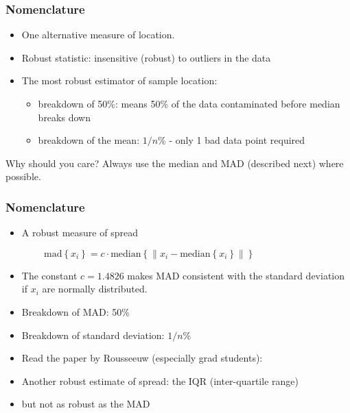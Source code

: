 \begin{frame}\frametitle{Nomenclature}
	{}
	\begin{itemize}
		\item	One alternative measure of location.
		\item	Robust statistic: insensitive (robust) to outliers in the data
		\item	The most robust estimator of sample location:
		\begin{itemize}
			\item	breakdown of 50\%: means 50\% of the data contaminated before median breaks down
			\item	breakdown of the mean: $1/n$\% - only 1 bad data point required
		\end{itemize}
	\end{itemize}
	\begin{exampleblock}{Why should you care?}
		Always use the median and MAD (described next) where possible.
	\end{exampleblock}
\end{frame}

\begin{frame}\frametitle{Nomenclature}
	{}
	\begin{itemize}
		\item	A robust measure of spread
	\end{itemize}
	$ \qquad\qquad \text{mad}\left\{ x_i \right\} = c \cdot \text{median}\left\{ \| x_i - \text{median}\left\{ x_i \right\} \| \right\} $
	\begin{itemize}
		\item	The constant $c = 1.4826$ makes MAD consistent with the standard deviation if $x_i$ are normally distributed.
		\item	Breakdown of MAD: 50\%
		\item	Breakdown of standard deviation: $1/n$\%
	\end{itemize}
	\begin{itemize}
		\item	Read the paper by Rousseeuw (especially grad students):
		\iftoggle{hrymak}{
			\begin{itemize}
				\item	\href{http://literature.connectmv.com/item/173}{http://literature.connectmv.com/item/173}
			\end{itemize}
		}{
			\begin{itemize}
				\item	\href{http://learnche.mcmaster.ca/media/mcmaster/Rousseeuw-tutorial.pdf}{http://learnche.mcmaster.ca/media/mcmaster/Rousseeuw-tutorial.pdf}
			\end{itemize}
		}
	\end{itemize}
	\begin{itemize}
		\item	Another robust estimate of spread: the IQR (inter-quartile range)
		\item	but not as robust as the MAD
	\end{itemize}
\end{frame}

